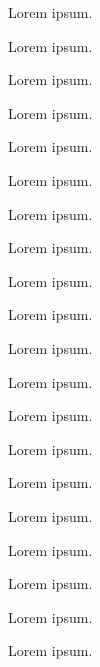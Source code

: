 
Lorem ipsum.


Lorem ipsum.


Lorem ipsum.


Lorem ipsum.


Lorem ipsum.


Lorem ipsum.


Lorem ipsum.


Lorem ipsum.


Lorem ipsum.


Lorem ipsum.


Lorem ipsum.


Lorem ipsum.


Lorem ipsum.


Lorem ipsum.


Lorem ipsum.


Lorem ipsum.


Lorem ipsum.


Lorem ipsum.


Lorem ipsum.


Lorem ipsum.


